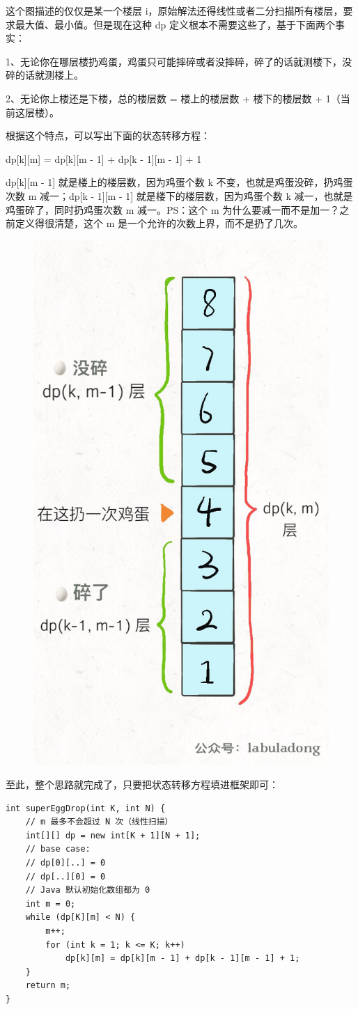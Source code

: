 \documentclass[12pt]{article}
\begin{document}
这个图描述的仅仅是某一个楼层 i，原始解法还得线性或者二分扫描所有楼层，要求最大值、最小值。但是现在这种 dp 定义根本不需要这些了，基于下面两个事实：

1、无论你在哪层楼扔鸡蛋，鸡蛋只可能摔碎或者没摔碎，碎了的话就测楼下，没碎的话就测楼上。

2、无论你上楼还是下楼，总的楼层数 = 楼上的楼层数 + 楼下的楼层数 + 1（当前这层楼）。

根据这个特点，可以写出下面的状态转移方程：

dp[k][m] = dp[k][m - 1] + dp[k - 1][m - 1] + 1

dp[k][m - 1] 就是楼上的楼层数，因为鸡蛋个数 k 不变，也就是鸡蛋没碎，扔鸡蛋次数 m 减一；dp[k - 1][m - 1] 就是楼下的楼层数，因为鸡蛋个数 k 减一，也就是鸡蛋碎了，同时扔鸡蛋次数 m 减一。PS：这个 m 为什么要减一而不是加一？之前定义得很清楚，这个 m 是一个允许的次数上界，而不是扔了几次。
\begin{figure}[H]
    \centering
    \includegraphics[width=.4\textwidth]{fig/Dynamic_Programming_Egg_Throw_3.jpg}
\end{figure}

至此，整个思路就完成了，只要把状态转移方程填进框架即可：
\begin{lstlisting}
int superEggDrop(int K, int N) {
    // m 最多不会超过 N 次（线性扫描）
    int[][] dp = new int[K + 1][N + 1];
    // base case:
    // dp[0][..] = 0
    // dp[..][0] = 0
    // Java 默认初始化数组都为 0
    int m = 0;
    while (dp[K][m] < N) {
        m++;
        for (int k = 1; k <= K; k++)
            dp[k][m] = dp[k][m - 1] + dp[k - 1][m - 1] + 1;
    }
    return m;
}
\end{lstlisting}
\end{document}

